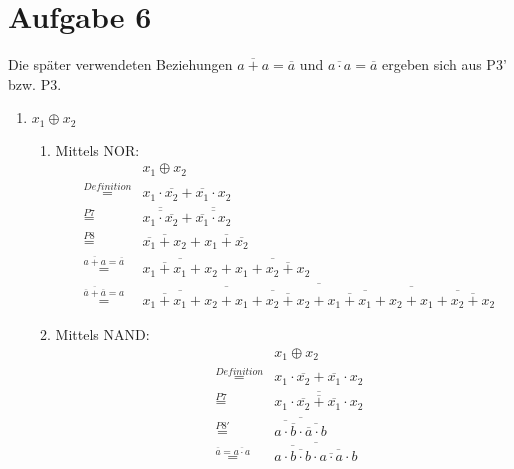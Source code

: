 \documentclass[a4paper]{article}
\begin{document}
\section*{Aufgabe 6}
Die später verwendeten Beziehungen $\overline{a + a} = \overline{a}$ und $\overline{a \cdot a} = \overline{a}$ ergeben sich aus P3' bzw. P3.
\begin{enumerate}[label=\alph*)]
	\item $x_1 \oplus x_2 $
	\begin{enumerate}[label=(\roman*)]
		\item Mittels NOR:
		\begin{equation}
		\begin{aligned}
			&&x_1 \oplus x_2 \\
			&\stackrel{Definition}{=} &x_1 \cdot \overline{x_2} + \overline{x_1} \cdot x_2 \\
			&\stackrel{P7}{=} &\overline{\overline{x_1 \cdot \overline{x_2}}} + \overline{\overline{\overline{x_1} \cdot x_2}} \\
			&\stackrel{P8}{= } &\overline{\overline{x_1} + x_2} + \overline{x_1 + \overline{x_2}} \\
			&\stackrel{\overline{a + a} = \overline{a}}{=} & \overline{\overline{x_1 + x_1} + x_2} + \overline{x_1 + \overline{x_2 + x_2}} \\
			&\stackrel{\overline{\overline{a} + \overline{a}} = a}{=} &\overline{\overline{\overline{\overline{x_1 + x_1} + x_2} + \overline{x_1 + \overline{x_2 + x_2}}} + \overline{\overline{\overline{x_1 + x_1} + x_2} + \overline{x_1 + \overline{x_2 + x_2}}}}
		\end{aligned}
		\end{equation} 
		
		\item Mittels NAND:
		\begin{equation}
		\begin{aligned}
			&&x_1 \oplus x_2 \\
			&\stackrel{Definition}{=} &x_1 \cdot \overline{x_2} + \overline{x_1} \cdot x_2 \\
			&\stackrel{P7}{=} &\overline{\overline{x_1 \cdot \overline{x_2} + \overline{x_1} \cdot x_2}} \\
			&\stackrel{P8'}{=} &\overline{\overline{a \cdot \overline{b}} \cdot \overline{\overline{a} \cdot b}} \\
			&\stackrel{\overline{a} = \overline{a \cdot a}}{=} &\overline{\overline{a \cdot \overline{b \cdot b}} \cdot \overline{\overline{a \cdot a} \cdot b}}
		\end{aligned}
		\end{equation}
	\end{enumerate}


\end{enumerate}
\end{document}
